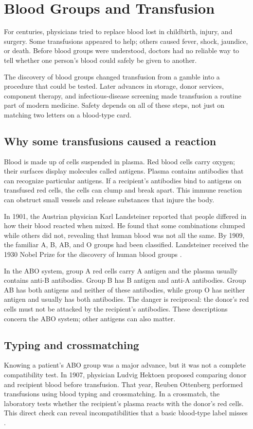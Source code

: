 \documentclass[12pt,oneside]{book}
\begin{document}
\chapter[Blood Groups and Transfusion]{Blood Groups and Transfusion}

For centuries, physicians tried to replace blood lost in childbirth, injury,
and surgery. Some transfusions appeared to help; others caused fever, shock,
jaundice, or death. Before blood groups were understood, doctors had no
reliable way to tell whether one person's blood could safely be given to
another.

The discovery of blood groups changed transfusion from a gamble into a
procedure that could be tested. Later advances in storage, donor services,
component therapy, and infectious-disease screening made transfusion a
routine part of modern medicine. Safety depends on all of these steps, not
just on matching two letters on a blood-type card.

\section{Why some transfusions caused a reaction}
Blood is made up of cells suspended in plasma. Red blood cells carry oxygen;
their surfaces display molecules called antigens. Plasma contains antibodies
that can recognize particular antigens. If a recipient's antibodies bind to
antigens on transfused red cells, the cells can clump and break apart. This
immune reaction can obstruct small vessels and release substances that injure
the body.

In 1901, the Austrian physician Karl Landsteiner reported that people differed
in how their blood reacted when mixed. He found that some combinations
clumped while others did not, revealing that human blood was not all the same.
By 1909, the familiar A, B, AB, and O groups had been classified. Landsteiner
received the 1930 Nobel Prize for the discovery of human blood groups
\cite{landsteinerNobel}.

In the ABO system, group A red cells carry A antigen and the plasma usually
contains anti-B antibodies. Group B has B antigen and anti-A antibodies.
Group AB has both antigens and neither of these antibodies, while group O
has neither antigen and usually has both antibodies. The danger is reciprocal:
the donor's red cells must not be attacked by the recipient's antibodies.
These descriptions concern the ABO system; other antigens can also matter.

\section{Typing and crossmatching}
Knowing a patient's ABO group was a major advance, but it was not a complete
compatibility test. In 1907, physician Ludvig Hektoen proposed comparing donor
and recipient blood before transfusion. That year, Reuben Ottenberg performed
transfusions using blood typing and crossmatching. In a crossmatch, the
laboratory tests whether the recipient's plasma reacts with the donor's red
cells. This direct check can reveal incompatibilities that a basic blood-type
label misses \cite{redcrossTransfusionHistory}.
\end{document}
